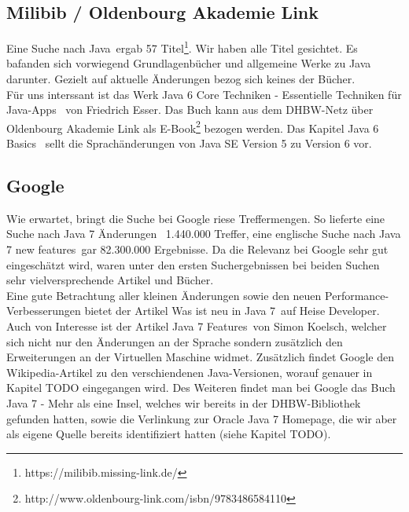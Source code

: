 \subsection{Milibib / Oldenbourg Akademie Link}
Eine Suche nach \glqq Java\grqq ~ergab 57 Titel\footnote{https://milibib.missing-link.de/}. Wir haben alle Titel gesichtet. Es bafanden sich vorwiegend Grundlagenbücher und allgemeine Werke zu Java darunter. Gezielt auf aktuelle Änderungen bezog sich keines der Bücher.\\

Für uns interssant ist das Werk \glqq Java 6 Core Techniken - Essentielle Techniken für Java-Apps\grqq\cite{java6core} ~von Friedrich Esser. Das Buch kann aus dem DHBW-Netz über Oldenbourg Akademie Link als E-Book\footnote{http://www.oldenbourg-link.com/isbn/9783486584110} bezogen werden. Das Kapitel \glqq Java 6 Basics\grqq\cite{java6core} ~sellt die Sprachänderungen von Java SE Version 5 zu Version 6 vor.

\subsection{Google}
Wie erwartet, bringt die Suche bei Google riese Treffermengen. So lieferte eine Suche nach \glqq Java 7 Änderungen\grqq~
1.440.000 Treffer, eine englische Suche nach \glqq Java 7 new features\grqq~gar 82.300.000 Ergebnisse. Da die Relevanz bei
Google sehr gut eingeschätzt wird, waren unter den ersten Suchergebnissen bei beiden Suchen sehr vielversprechende Artikel
und Bücher.\\

Eine gute Betrachtung aller kleinen Änderungen sowie den neuen Performance-Verbesserungen bietet der Artikel
\glqq Was ist neu in Java 7\grqq\cite{heiseWasistNeu}~auf Heise Developer.
Auch von Interesse ist der Artikel \glqq Java 7 Features\grqq\cite{blogJava7Features}~von Simon Koelsch, welcher sich nicht nur
den Änderungen an der Sprache sondern zusätzlich den Erweiterungen an der Virtuellen Maschine widmet.
Zusätzlich findet Google den Wikipedia-Artikel zu den verschiendenen Java-Versionen, worauf genauer in Kapitel TODO eingegangen wird.
Des Weiteren findet man bei Google das Buch \glqq Java 7 - Mehr als eine Insel\grqq\cite{javainsel2}, welches wir bereits in der
DHBW-Bibliothek gefunden hatten, sowie die Verlinkung zur Oracle Java 7 Homepage, die wir aber als eigene Quelle bereits
identifiziert hatten (siehe Kapitel TODO).

